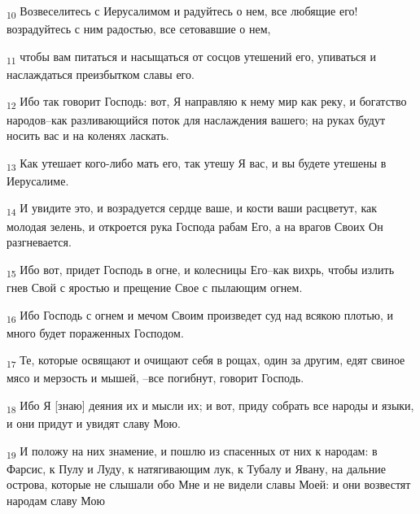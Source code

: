 \begin{tcolorbox}
\textsubscript{10} Возвеселитесь с Иерусалимом и радуйтесь о нем, все любящие его! возрадуйтесь с ним радостью, все сетовавшие о нем,
\end{tcolorbox}
\begin{tcolorbox}
\textsubscript{11} чтобы вам питаться и насыщаться от сосцов утешений его, упиваться и наслаждаться преизбытком славы его.
\end{tcolorbox}
\begin{tcolorbox}
\textsubscript{12} Ибо так говорит Господь: вот, Я направляю к нему мир как реку, и богатство народов--как разливающийся поток для наслаждения вашего; на руках будут носить вас и на коленях ласкать.
\end{tcolorbox}
\begin{tcolorbox}
\textsubscript{13} Как утешает кого-либо мать его, так утешу Я вас, и вы будете утешены в Иерусалиме.
\end{tcolorbox}
\begin{tcolorbox}
\textsubscript{14} И увидите это, и возрадуется сердце ваше, и кости ваши расцветут, как молодая зелень, и откроется рука Господа рабам Его, а на врагов Своих Он разгневается.
\end{tcolorbox}
\begin{tcolorbox}
\textsubscript{15} Ибо вот, придет Господь в огне, и колесницы Его--как вихрь, чтобы излить гнев Свой с яростью и прещение Свое с пылающим огнем.
\end{tcolorbox}
\begin{tcolorbox}
\textsubscript{16} Ибо Господь с огнем и мечом Своим произведет суд над всякою плотью, и много будет пораженных Господом.
\end{tcolorbox}
\begin{tcolorbox}
\textsubscript{17} Те, которые освящают и очищают себя в рощах, один за другим, едят свиное мясо и мерзость и мышей, --все погибнут, говорит Господь.
\end{tcolorbox}
\begin{tcolorbox}
\textsubscript{18} Ибо Я [знаю] деяния их и мысли их; и вот, приду собрать все народы и языки, и они придут и увидят славу Мою.
\end{tcolorbox}
\begin{tcolorbox}
\textsubscript{19} И положу на них знамение, и пошлю из спасенных от них к народам: в Фарсис, к Пулу и Луду, к натягивающим лук, к Тубалу и Явану, на дальние острова, которые не слышали обо Мне и не видели славы Моей: и они возвестят народам славу Мою
\end{tcolorbox}
